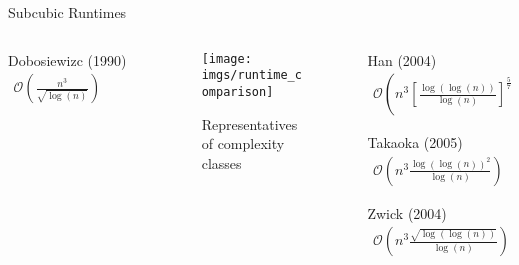 \begin{frame}{Subcubic Runtimes}
\begin{columns}
\begin{column}{.252\linewidth}
            {
                \begin{alertblock}{Dobosiewizc (1990)}
                    $\begin{aligned}
                        \mathcal{O}\left( \frac{n^3}{\sqrt{\log(n)}} \right)
                    \end{aligned}$
                \end{alertblock}
            }
        \end{column}
        \begin{column}{.48\linewidth}
            \begin{figure}
                \texttt{[image: imgs/runtime\_comparison]}
                \caption{Representatives of complexity classes}
            \end{figure}
        \end{column}
        \begin{column}{.25\linewidth}
            {
                \begin{alertblock}{Han (2004)}
                    $\begin{aligned}
                        \mathcal{O}\left( n^3 {\left[ \frac{\log(\log(n))}{\log(n)} \right]}^{\frac{5}{7}} \right)
                    \end{aligned}$
                \end{alertblock}
            }
            
            {
                \begin{alertblock}{Takaoka (2005)}
                    $\begin{aligned}
                        \mathcal{O}\left( n^3 \frac{{\log(\log(n))}^2}{\log(n)} \right)
                    \end{aligned}$
                \end{alertblock}
            }
            
            {
                \begin{alertblock}{Zwick (2004)}
                    $\begin{aligned}
                        \mathcal{O}\left( n^3 \frac{\sqrt{\log(\log(n))}}{\log(n)} \right)
                    \end{aligned}$
                \end{alertblock}
            }
            

\end{column}
\end{columns}
\end{frame}
